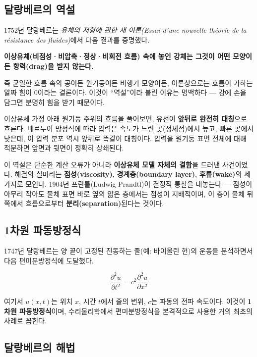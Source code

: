 \documentclass[11pt,a4paper]{article}
\begin{document}
\subsection{달랑베르의 역설}

1752년 달랑베르는 \emph{유체의 저항에 관한 새 이론(Essai d'une nouvelle théorie de la résistance des fluides)}에서 다음 결과를 증명했다.

\begin{quotebox}
\textbf{이상유체(비점성·비압축·정상·비회전 흐름) 속에 놓인 강체는 그것이 어떤 모양이든 항력(drag)을 받지 않는다.}
\end{quotebox}

즉 균일한 흐름 속의 공이든 원기둥이든 비행기 모양이든, 이론상으로는 흐름이 가하는 알짜 힘이 0이라는 결론이다. 이것이 ``역설''이라 불린 이유는 명백하다 --- 강에 손을 담그면 분명히 힘을 받기 때문이다.

이상유체 가정 아래 원기둥 주위의 흐름을 풀어보면, 유선이 \textbf{앞뒤로 완전히 대칭}으로 흐른다. 베르누이 방정식에 따라 압력은 속도가 느린 곳(정체점)에서 높고, 빠른 곳에서 낮은데, 이 압력 분포 역시 앞뒤로 똑같이 대칭이다. 압력을 원기둥 표면 전체에 대해 적분하면 앞면과 뒷면이 정확히 상쇄된다.

이 역설은 단순한 계산 오류가 아니라 \textbf{이상유체 모델 자체의 결함}을 드러낸 사건이었다. 해결의 실마리는 \textbf{점성(viscosity)}, \textbf{경계층(boundary layer)}, \textbf{후류(wake)}의 세 가지로 모인다. 1904년 프란틀(Ludwig Prandtl)이 결정적 통찰을 내놓는다 --- 점성이 아무리 작아도 물체 표면 바로 옆의 얇은 층에서는 점성이 지배적이며, 이 층이 물체 뒤쪽에서 흐름으로부터 \textbf{분리(separation)}된다는 것이다.

\subsection{1차원 파동방정식}

1747년 달랑베르는 양 끝이 고정된 진동하는 줄(예: 바이올린 현)의 운동을 분석하면서 다음 편미분방정식에 도달했다.

\begin{equation}
\frac{\partial^2 u}{\partial t^2} = c^2 \frac{\partial^2 u}{\partial x^2}
\label{eq:wave1d}
\end{equation}

여기서 $u(x,t)$는 위치 $x$, 시간 $t$에서 줄의 변위, $c$는 파동의 전파 속도이다. 이것이 \textbf{1차원 파동방정식}이며, 수리물리학에서 편미분방정식을 본격적으로 사용한 거의 최초의 사례로 꼽힌다.

\subsection{달랑베르의 해법}
\end{document}
